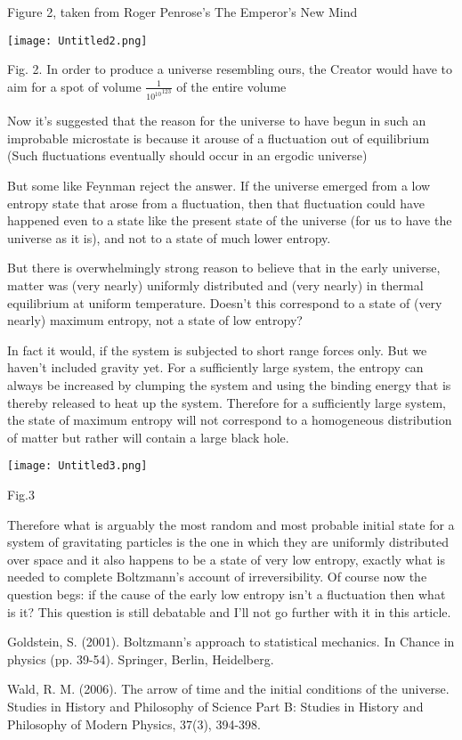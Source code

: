 \documentclass[11pt]{article}
\begin{document}
Figure 2, taken from Roger Penrose's The Emperor's New Mind

\begin{center}
\texttt{[image: Untitled2.png]}

Fig. 2. In order to produce a universe resembling ours, the Creator
would have to aim for a spot of volume $\frac{1}{{{10}^{10}}^{123}}$ of the entire volume
\end{center}



Now it's suggested that the reason for the universe to have begun in such an improbable microstate is because it arouse of a fluctuation out of equilibrium (Such fluctuations eventually should occur in an ergodic universe) 

But some like Feynman reject the answer. If the universe emerged from a low entropy state that arose from a fluctuation, then that fluctuation could have happened even to a state like the present state of the universe (for us to have the universe as it is), and not to a state of much lower entropy.

But there is overwhelmingly strong reason to believe that in the early universe, matter was (very nearly) uniformly distributed and (very nearly) in thermal equilibrium at uniform temperature. Doesn't this correspond to a state of (very nearly) maximum entropy, not a state of low entropy? \cite{R}

In fact it would, if the system is subjected to short range forces only. But we haven't included gravity yet. For a sufficiently large system, the entropy can always be increased by clumping the system and using the binding energy that is thereby released to heat up the system. Therefore for a sufficiently large system, the state of maximum entropy will not correspond to a homogeneous distribution of matter but rather will contain a large black hole. 

\begin{center}
\texttt{[image: Untitled3.png]}

Fig.3
\end{center}

Therefore what is arguably the most random and most probable initial state for a system of gravitating particles is the one in which they are uniformly distributed over space
and it also happens to be a state of very low entropy, exactly what is needed to complete Boltzmann's account of irreversibility. Of course now the question begs: if the cause of the early low entropy isn't a fluctuation then what is it? This question is still debatable and I'll not go further with it in this article.

\begin{thebibliography}{9}
	
	Goldstein, S. (2001). Boltzmann’s approach to statistical mechanics. In Chance in physics (pp. 39-54). Springer, Berlin, Heidelberg.
	
	Wald, R. M. (2006). The arrow of time and the initial conditions of the universe. Studies in History and Philosophy of Science Part B: Studies in History and Philosophy of Modern Physics, 37(3), 394-398.
	
\end{thebibliography}
\end{document}
